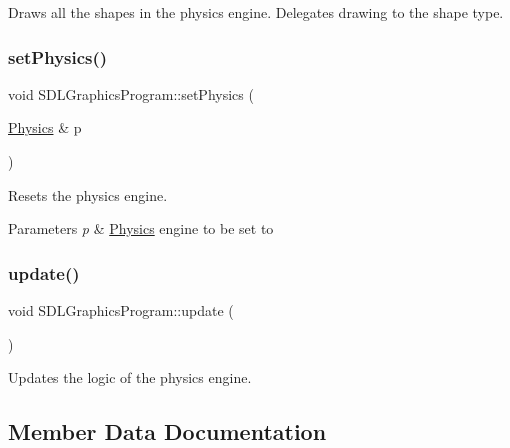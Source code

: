 Draws all the shapes in the physics engine. Delegates drawing to the shape type. 

\mbox{\label{class_s_d_l_graphics_program_aeb4a2f57b396a2a053a80ff0cc41149d}} 
\subsubsection{\texorpdfstring{setPhysics()}{setPhysics()}}
{\footnotesize\ttfamily void S\+D\+L\+Graphics\+Program\+::set\+Physics (\begin{DoxyParamCaption}\item[{\mbox{\hyperlink{class_physics}{Physics}} \&}]{p }\end{DoxyParamCaption})}



Resets the physics engine. 


\begin{DoxyParams}{Parameters}
{\em p} & \mbox{\hyperlink{class_physics}{Physics}} engine to be set to \\
\hline
\end{DoxyParams}
\mbox{\label{class_s_d_l_graphics_program_a67a6cb42ec9bce6245a617de62cfdc20}} 
\subsubsection{\texorpdfstring{update()}{update()}}
{\footnotesize\ttfamily void S\+D\+L\+Graphics\+Program\+::update (\begin{DoxyParamCaption}{ }\end{DoxyParamCaption})}



Updates the logic of the physics engine. 



\subsection{Member Data Documentation}
\mbox{\label{class_s_d_l_graphics_program_ad79474da1a537585fb5359786b0d8e5d}} 

